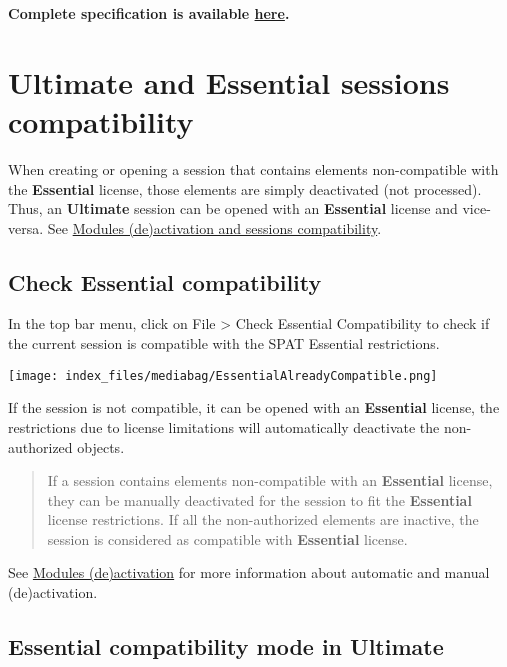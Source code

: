 \documentclass[
  letterpaper,
  DIV=11,
  numbers=noendperiod]{scrreport}
\begin{document}
\textbf{Complete specification is available
\href{https://www.flux.audio/project/spat-revolution/\#specifications}{here}.}

\hypertarget{ultimate-and-essential-sessions-compatibility}{%
\section{Ultimate and Essential sessions
compatibility}\label{ultimate-and-essential-sessions-compatibility}}

When creating or opening a session that contains elements non-compatible
with the \textbf{Essential} license, those elements are simply
deactivated (not processed). Thus, an \textbf{Ultimate} session can be
opened with an \textbf{Essential} license and vice-versa. See
\href{Spat_Environment_Modules_de_activation.md}{Modules (de)activation
and sessions compatibility}.

\hypertarget{check-essential-compatibility}{%
\subsection{Check Essential
compatibility}\label{check-essential-compatibility}}

In the top bar menu, click on File \textgreater{} Check Essential
Compatibility to check if the current session is compatible with the
SPAT Essential restrictions.

\texttt{[image: index\_files/mediabag/EssentialAlreadyCompatible.png]}

If the session is not compatible, it can be opened with an
\textbf{Essential} license, the restrictions due to license limitations
will automatically deactivate the non-authorized objects.

\begin{quote}
If a session contains elements non-compatible with an \textbf{Essential}
license, they can be manually deactivated for the session to fit the
\textbf{Essential} license restrictions. If all the non-authorized
elements are inactive, the session is considered as compatible with
\textbf{Essential} license.
\end{quote}

See \href{Spat_Environment_Modules_de_activation.md}{Modules
(de)activation} for more information about automatic and manual
(de)activation.

\hypertarget{essential-compatibility-mode-in-ultimate}{%
\subsection{Essential compatibility mode in
Ultimate}\label{essential-compatibility-mode-in-ultimate}}
\end{document}
